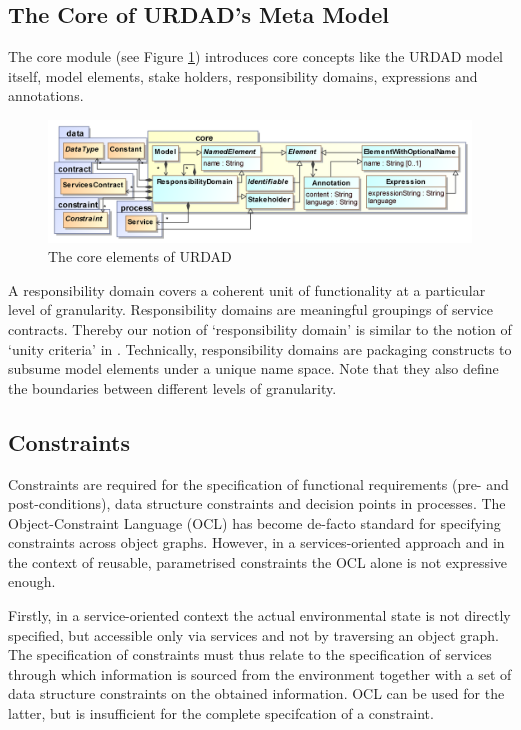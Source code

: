 {%
\subsection{The Core of URDAD's Meta Model}

The core module (see Figure \ref{fig:coreModule}) introduces core concepts like the URDAD model itself, model elements, stake holders, responsibility domains, expressions and annotations.
\begin{figure}[Htb]
  \centering
  \includegraphics{core}
  \caption{The core elements of URDAD}
  \label{fig:coreModule}
\end{figure}

A responsibility domain covers a coherent unit of functionality at a particular level of granularity. Responsibility domains are meaningful groupings of service contracts. Thereby our notion of `responsibility domain' is similar to the notion of `unity criteria' in \cite{gonzalez_unity_2009}. Technically, responsibility domains are packaging constructs to subsume model elements under a unique name space. Note that they also define the boundaries between different levels of granularity. 

\subsection{Constraints}

Constraints are required for the specification of functional requirements (pre- and post-conditions), data structure constraints and decision points in processes. 
The Object-Constraint Language (OCL) has become de-facto standard for specifying constraints across object graphs. However, in a services-oriented approach and in the context of reusable, parametrised constraints the OCL alone is not expressive enough. 

Firstly, in a service-oriented context the actual environmental state is not directly specified, but accessible only via services and not by traversing an object graph. The specification of constraints must thus relate to the specification of services through which information is sourced from the environment together with a set of data structure constraints on the obtained information. OCL can be used for the latter, but is insufficient for the complete specifcation of a constraint.

}
